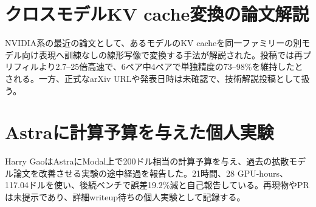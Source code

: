 \section{クロスモデルKV cache変換の論文解説}
NVIDIA系の最近の論文として、あるモデルのKV cacheを同一ファミリーの別モデル向け表現へ訓練なしの線形写像で変換する手法が解説された。投稿では再プリフィルより2.7--25倍高速で、6ペア中4ペアで単独精度の73--98\%を維持したとされる。一方、正式なarXiv URLや発表日時は未確認で、技術解説投稿として扱う。
\section{Astraに計算予算を与えた個人実験}
Harry GaoはAstraにModal上で200ドル相当の計算予算を与え、過去の拡散モデル論文を改善させる実験の途中経過を報告した。21時間、28 GPU-hours、117.04ドルを使い、後続ベンチで誤差19.2\%減と自己報告している。再現物やPRは未提示であり、詳細writeup待ちの個人実験として記録する。
